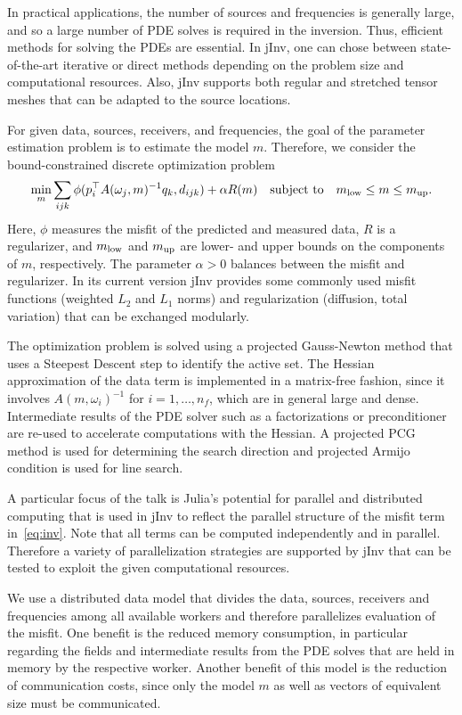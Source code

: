 \documentclass{report}
\begin{document}
In practical applications, the number of sources and frequencies is
generally large, and so a large number of PDE solves is required in the
inversion. Thus, efficient methods for solving the PDEs are essential. In
jInv, one can chose between state-of-the-art iterative or direct methods
depending on the problem size and computational resources. Also, jInv
supports both regular and stretched tensor meshes that can be adapted to
the source locations.

For given data, sources, receivers, and frequencies, the goal of the
parameter estimation problem is to estimate the model $m$. Therefore, we
consider the bound-constrained discrete optimization problem
\begin{equation}\label{eq:inv}
\min_{m} \sum_{ijk} \phi( p_{i}^\top {A}(\omega_{j},m)^{-1}q_{k}
,d_{ijk}) + \alpha R(m)\quad
{\rm subject\ to } \quad m_{\rm low} \leq m \leq m_{\rm up}.
\end{equation}
Here, $\phi$ measures the misfit of the predicted and measured data, $R$
is a regularizer, and $m_{\rm low}$ and $m_{\rm up}$ are lower- and upper
bounds on the components of $m$, respectively. The parameter $\alpha>0$
balances between the misfit and regularizer. In its current version jInv
provides some commonly used misfit functions (weighted $L_2$ and $L_1$
norms) and regularization (diffusion, total variation) that can be
exchanged modularly.

The optimization problem is solved using a projected Gauss-Newton method
that uses a Steepest Descent step to identify the active set. The Hessian
approximation of the data term is implemented in a matrix-free fashion,
since it involves $A(m,\omega_i)^{-1}$ for $i=1,\ldots,n_f$, which are in
general large and dense. Intermediate results of the PDE solver such as a
factorizations or preconditioner are re-used to accelerate computations
with the Hessian. A projected PCG method is used for determining the
search direction and projected Armijo condition is used for line search.

A particular focus of the talk is Julia's potential for parallel and
distributed computing that is used in jInv to reflect the parallel
structure of the misfit term in~\eqref{eq:inv}. Note that all terms can
be computed independently and in parallel. Therefore a variety of
parallelization strategies are supported by jInv that can be tested to
exploit the given computational resources.

We use a distributed data model that divides the data, sources, receivers
and frequencies among all available workers and therefore parallelizes
evaluation of the misfit. One benefit is the reduced memory consumption,
in particular regarding the fields and intermediate results from the PDE
solves that are held in memory by the respective worker. Another benefit
of this model is the reduction of communication costs, since only the
model $m$ as well as vectors of equivalent size must be communicated.
\end{document}

